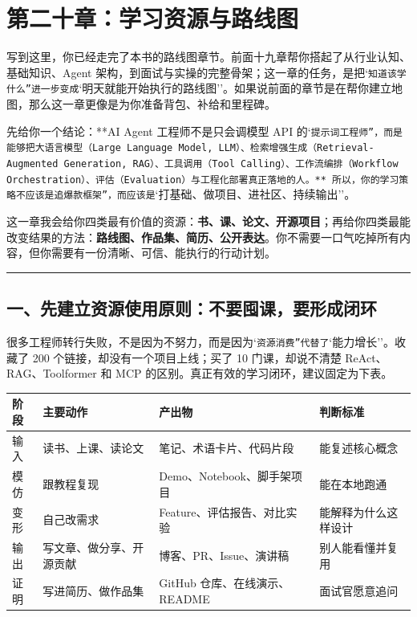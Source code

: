 \chapter{第二十章：学习资源与路线图}

写到这里，你已经走完了本书的路线图章节。前面十九章帮你搭起了从行业认知、基础知识、Agent 架构，到面试与实操的完整骨架；这一章的任务，是把`\texttt{知道该学什么''进一步变成}`明天就能开始执行的路线图''。如果说前面的章节是在帮你建立地图，那么这一章更像是为你准备背包、补给和里程碑。


先给你一个结论：**AI Agent 工程师不是只会调模型 API 的`\texttt{提示词工程师''，而是能够把大语言模型（Large Language Model, LLM）、检索增强生成（Retrieval-Augmented Generation, RAG）、工具调用（Tool Calling）、工作流编排（Workflow Orchestration）、评估（Evaluation）与工程化部署真正落地的人。** 所以，你的学习策略不应该是}\texttt{追爆款框架''，而应该是}`打基础、做项目、进社区、持续输出''。


这一章我会给你四类最有价值的资源：\textbf{书、课、论文、开源项目}；再给你四类最能改变结果的方法：\textbf{路线图、作品集、简历、公开表达}。你不需要一口气吃掉所有内容，但你需要有一份清晰、可信、能执行的行动计划。


\bigskip\hrule\bigskip

\section{一、先建立资源使用原则：不要囤课，要形成闭环}

很多工程师转行失败，不是因为不努力，而是因为`\texttt{资源消费''代替了}`能力增长''。收藏了 200 个链接，却没有一个项目上线；买了 10 门课，却说不清楚 ReAct、RAG、Toolformer 和 MCP 的区别。真正有效的学习闭环，建议固定为下表。


\begingroup
\scriptsize
\setlength{\tabcolsep}{3pt}
\begin{longtable}{|p{}|p{}|p{}|p{}|}
\hline
阶段 & 主要动作 & 产出物 & 判断标准 \\ \hline
输入 & 读书、上课、读论文 & 笔记、术语卡片、代码片段 & 能复述核心概念 \\ \hline
模仿 & 跟教程复现 & Demo、Notebook、脚手架项目 & 能在本地跑通 \\ \hline
变形 & 自己改需求 & Feature、评估报告、对比实验 & 能解释为什么这样设计 \\ \hline
输出 & 写文章、做分享、开源贡献 & 博客、PR、Issue、演讲稿 & 别人能看懂并复用 \\ \hline
证明 & 写进简历、做作品集 & GitHub 仓库、在线演示、README & 面试官愿意追问 \\ \hline
\end{longtable}
\endgroup

